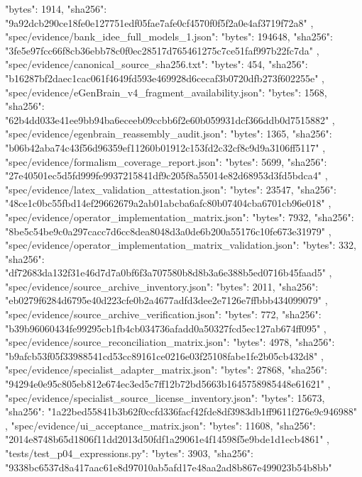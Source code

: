 {{{      "bytes": 1914,
      "sha256": "9a92dcb290ce18fe0e127751edf05fae7afe0cf4570f0f5f2a0e4af3719f72a8"
    },
    "spec/evidence/bank_idee_full_models_1.json": {
      "bytes": 194648,
      "sha256": "3fe5e97fcc66f8cb36ebb78c0f0ec28517d765461275c7ce51faf997b22fc7da"
    },
    "spec/evidence/canonical_source_sha256.txt": {
      "bytes": 454,
      "sha256": "b16287bf2daec1cac061f4649fd593e469928d6cecaf3b0720dfb273f602255e"
    },
    "spec/evidence/eGenBrain_v4_fragment_availability.json": {
      "bytes": 1568,
      "sha256": "62b4dd033e41ee9bb94ba6eceeb09ccbb6f2e60b059931dcf366ddb0d7515882"
    },
    "spec/evidence/egenbrain_reassembly_audit.json": {
      "bytes": 1365,
      "sha256": "b06b42aba74c43f56d96359ef11260b01912c153fd2c32cf8c9d9a3106ff5117"
    },
    "spec/evidence/formalism_coverage_report.json": {
      "bytes": 5699,
      "sha256": "27e40501ec5d5fd999fe9937215841df9c205f8a55014e82d68953d3fd5bdca4"
    },
    "spec/evidence/latex_validation_attestation.json": {
      "bytes": 23547,
      "sha256": "48ce1c0bc55fbd14ef29662679a2ab01abcba6afc80b07404cba6701cb96e018"
    },
    "spec/evidence/operator_implementation_matrix.json": {
      "bytes": 7932,
      "sha256": "8be5c54be9c0a297cacc7d6cc8dea8048d3a0de6b200a55176c10fe673e31979"
    },
    "spec/evidence/operator_implementation_matrix_validation.json": {
      "bytes": 332,
      "sha256": "df72683da132f31e46d7d7a0bf6f3a707580b8d8b3a6e388b5ed0716b45faad5"
    },
    "spec/evidence/source_archive_inventory.json": {
      "bytes": 2011,
      "sha256": "eb0279f6284d6795e40d223cfe0b2a4677adfd3dee2e7126e7ffbbb434099079"
    },
    "spec/evidence/source_archive_verification.json": {
      "bytes": 772,
      "sha256": "b39b96060434fe99295cb1fb4cb034736afadd0a50327fcd5ec127ab674ff095"
    },
    "spec/evidence/source_reconciliation_matrix.json": {
      "bytes": 4978,
      "sha256": "b9afcb53f05f33988541cd53cc89161ce0216e03f25108fabe1fe2b05cb432d8"
    },
    "spec/evidence/specialist_adapter_matrix.json": {
      "bytes": 27868,
      "sha256": "94294e0e95c805eb812e674ec3ed5c7ff12b72bd5663b1645758985448e61621"
    },
    "spec/evidence/specialist_source_license_inventory.json": {
      "bytes": 15673,
      "sha256": "1a22bed55841b3b62f0ccfd336facf42fde8df3983db1ff9611f276e9c946988"
    },
    "spec/evidence/ui_acceptance_matrix.json": {
      "bytes": 11608,
      "sha256": "2014e8748b65d1806f11dd2013d50fdf1a29061e4f14598f5e9bde1d1ecb4861"
    },
    "tests/test_p04_expressions.py": {
      "bytes": 3903,
      "sha256": "9338bc6537d8a417aac61e8d97010ab5afd17e48aa2ad8b867e499023b54b8bb"
}}}
